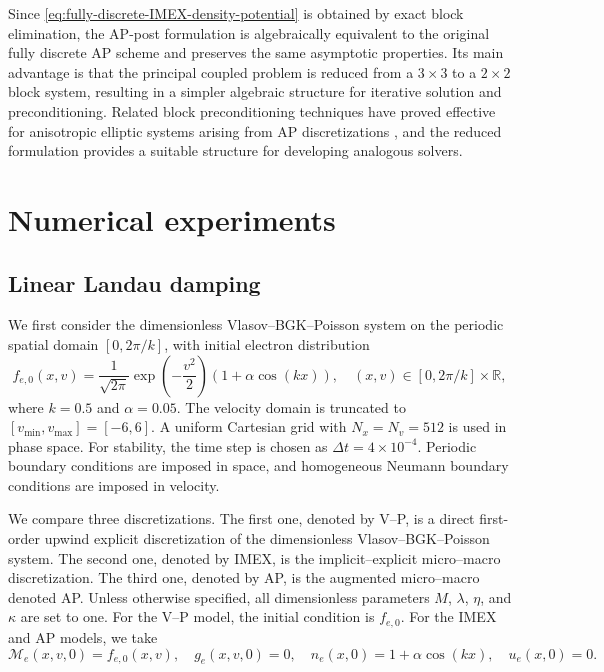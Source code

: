 \documentclass[pdflatex,final,10pt]{article}
\newcommand{\Fabrice}[1]{#1}
\begin{document}
Since \eqref{eq:fully-discrete-IMEX-density-potential} is obtained by exact block
elimination, the AP-post formulation is algebraically equivalent to the
original fully discrete AP scheme and preserves the same asymptotic
properties. Its main advantage is that the principal coupled problem is
reduced from a $3\times3$ to a $2\times2$ block system, resulting in a
simpler algebraic structure for iterative solution and preconditioning. Related block preconditioning techniques have proved effective for anisotropic elliptic systems arising from AP discretizations \cite{li2024block}, and the reduced formulation provides a suitable structure for developing analogous solvers.


\section{Numerical experiments}
\subsection{Linear Landau damping}
We first consider the dimensionless Vlasov--BGK--Poisson system on the periodic spatial domain $[0,2\pi/k]$, with initial electron distribution
\begin{equation*}
    f_{e,0}(x,v)=\frac{1}{\sqrt{2\pi}}\exp\left(-\frac{v^2}{2}\right)
    \left(1+\alpha\cos(kx)\right),
    \quad (x,v)\in [0,2\pi/k]\times\mathbb{R},
\end{equation*}
where $k=0.5$ and $\alpha=0.05$. The velocity domain is truncated to $[v_{\min},v_{\max}]=[-6,6]$. A uniform Cartesian grid with $N_x=N_v=512$ is used in phase space. For stability, the time step is chosen as $\Delta t=4\times10^{-4}$. Periodic boundary conditions are imposed in space, and homogeneous Neumann boundary conditions are imposed in velocity.

We compare three discretizations. The first one, denoted by V--P, is a direct first-order upwind explicit discretization of the dimensionless Vlasov--BGK--Poisson system. The second one, denoted by IMEX, is the implicit--explicit micro--macro discretization. The third one, denoted by AP, is the \Fabrice{augmented micro--macro denoted AP.}  Unless otherwise specified, all dimensionless parameters $M$, $\lambda$, $\eta$, and $\kappa$ are set to one. For the V--P model, the initial condition is $f_{e,0}$. For the IMEX and AP models, we take
\begin{equation*}
    \mathcal{M}_{e}(x,v,0)=f_{e,0}(x,v),\quad g_e(x,v,0)=0,
    \quad n_e(x,0)=1+\alpha\cos(kx),\quad u_e(x,0)=0 .
\end{equation*}
\end{document}
